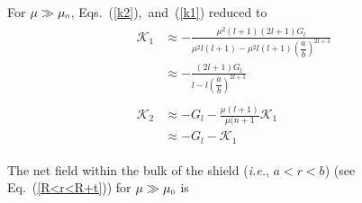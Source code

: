For $\mu\gg\mu_{\scriptscriptstyle 0}$, Eqs.~(\ref{k2}),~and~(\ref{k1}) reduced to
\begin{align}
    \begin{split}\label{k11}
        \mathcal{K}_1 & \approx-\frac{\mu^2(l+1) (2l+1)G_l}{\mu^2 l(l+1)-\mu^2 l(l+1)\left(\dfrac{a}{b}\right)^{2l+1}}\\
        & \approx-\frac{(2l+1)G_l}{l-l\left(\dfrac{a}{b}\right)^{2l+1}}
    \end{split}\\
    \begin{split}\label{k21}
        \mathcal{K}_2 & \approx-G_l-\frac{\mu(l+1)}{\mu(n+1}\mathcal{K}_1\\
        & \approx-G_l-\mathcal{K}_1
    \end{split}
\end{align}


The net field  within the bulk of the shield (\textit{i.e.}, $a<r<b$) (see Eq.~(\ref{R<r<R+t})) for \(\mu\gg\mu_{\scriptscriptstyle 0}\) is 



